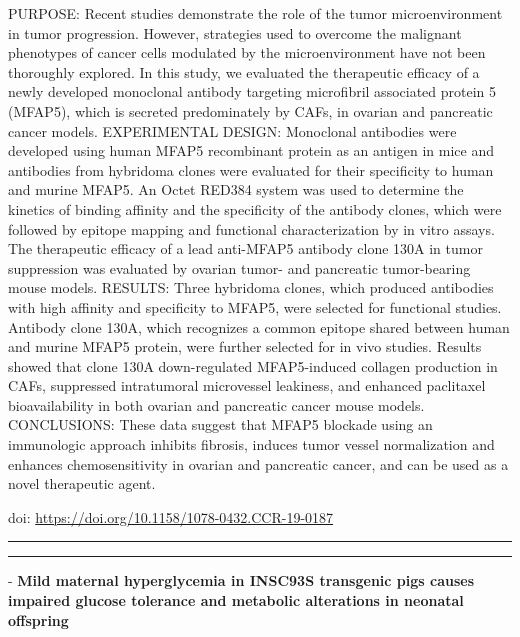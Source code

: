 \documentclass[]{article}
\begin{document}
PURPOSE: Recent studies demonstrate the role of the tumor
microenvironment in tumor progression. However, strategies used to
overcome the malignant phenotypes of cancer cells modulated by the
microenvironment have not been thoroughly explored. In this study, we
evaluated the therapeutic efficacy of a newly developed monoclonal
antibody targeting microfibril associated protein 5 (MFAP5), which is
secreted predominately by CAFs, in ovarian and pancreatic cancer models.
EXPERIMENTAL DESIGN: Monoclonal antibodies were developed using human
MFAP5 recombinant protein as an antigen in mice and antibodies from
hybridoma clones were evaluated for their specificity to human and
murine MFAP5. An Octet RED384 system was used to determine the kinetics
of binding affinity and the specificity of the antibody clones, which
were followed by epitope mapping and functional characterization by in
vitro assays. The therapeutic efficacy of a lead anti-MFAP5 antibody
clone 130A in tumor suppression was evaluated by ovarian tumor- and
pancreatic tumor-bearing mouse models. RESULTS: Three hybridoma clones,
which produced antibodies with high affinity and specificity to MFAP5,
were selected for functional studies. Antibody clone 130A, which
recognizes a common epitope shared between human and murine MFAP5
protein, were further selected for in vivo studies. Results showed that
clone 130A down-regulated MFAP5-induced collagen production in CAFs,
suppressed intratumoral microvessel leakiness, and enhanced paclitaxel
bioavailability in both ovarian and pancreatic cancer mouse models.
CONCLUSIONS: These data suggest that MFAP5 blockade using an immunologic
approach inhibits fibrosis, induces tumor vessel normalization and
enhances chemosensitivity in ovarian and pancreatic cancer, and can be
used as a novel therapeutic agent.

doi: \url{https://doi.org/10.1158/1078-0432.CCR-19-0187}

{}

{}

\begin{center}\rule{0.5\linewidth}{\linethickness}\end{center}

\begin{center}\rule{0.5\linewidth}{\linethickness}\end{center}

 - \textbf{Mild maternal hyperglycemia in INSC93S transgenic pigs causes
impaired glucose tolerance and metabolic alterations in neonatal
offspring}
\end{document}
